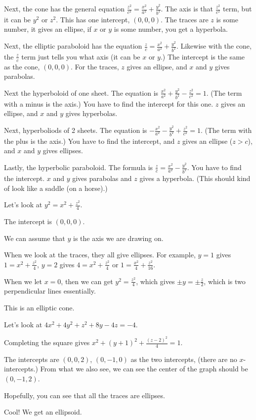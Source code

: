 \documentclass[../calc3.tex]{subfiles}
\begin{document}
Next, the cone has the general equation $\frac{z^2}{c^2}=\frac{x^2}{a^2}+\frac{y^2}{b^2}$. The axis is that $\frac{z^2}{c^2}$ term, but it can be $y^2$ or $z^2$.
This has one intercept, $(0,0,0)$. The traces are $z$ is some number, it gives an ellipse, if $x$ or $y$ is some number, you get a hyperbola.

Next, the elliptic paraboloid has the equation $\frac{z}{c}=\frac{x^2}{a^2}+\frac{y^2}{b^2}$. Likewise with the cone, the $\frac{z}{c}$ term just tells you what axis (it can be $x$ or $y$.)
The intercept is the same as the cone, $(0,0,0)$. For the traces, $z$ gives an ellipse, and $x$ and $y$ gives parabolas.

Next the hyperboloid of one sheet. The equation is $\frac{x^2}{a^2}+\frac{y^2}{b^2}-\frac{z^2}{c^2}=1$. (The term with a minus is the axis.)
You have to find the intercept for this one. $z$ gives an ellipse, and $x$ and $y$ gives hyperbolas.

Next, hyperboliods of 2 sheets. The equation is $-\frac{x^2}{a^2}-\frac{y^2}{b^2}+\frac{z^2}{c^2}=1$. (The term with the plus is the axis.)
You have to find the intercept, and $z$ gives an ellipse ($z>c$), and $x$ and $y$ gives ellipses.

Lastly, the hyperbolic paraboloid. The formula is $\frac{z}{c}=\frac{x^2}{a^2}-\frac{y^2}{b^2}$. You have to find the intercept. $x$ and $y$ gives parabolas and $z$ gives a hyperbola. (This should kind of look like a saddle (on a horse).)

\begin{example}
    Let's look at $y^2=x^2+\frac{z^2}{4}$.

    The intercept is $(0,0,0)$.

    We can assume that $y$ is the axis we are drawing on. 

    When we look at the traces, they all give ellipses.
    For example, $y=1$ gives $1=x^2+\frac{z^2}{4}$, $y=2$ gives $4=x^2+\frac{z^2}{4}$ or $1=\frac{x^2}{4}+\frac{z^2}{16}$.

    When we let $x=0$, then we can get $y^2=\frac{z^2}{4}$, which gives $\pm y = \pm \frac{z}{2}$, which is two perpendicular lines essentially.

    This is an elliptic cone.
\end{example}

\begin{example}
    Let's look at $4x^2+4y^2+z^2+8y-4z=-4$.

    Completing the square gives $x^2+(y+1)^2+\frac{(z-2)^2}{4}=1$.

    The intercepts are $(0,0,2)$, $(0,-1,0)$ as the two intercepts, (there are no $x$-intercepts.) From what we also see, we can see the center of the graph should be $(0,-1,2)$.

    Hopefully, you can see that all the traces are ellipses.

    Cool! We get an ellipsoid.
\end{example}
\end{document}
